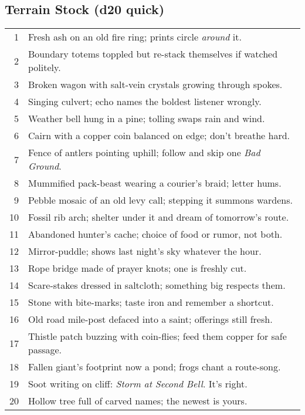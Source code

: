 \subsection*{Terrain Stock (d20 quick)}
\begin{tabular}{r l}
1 & Fresh ash on an old fire ring; prints circle \emph{around} it. \\
2 & Boundary totems toppled but re-stack themselves if watched politely. \\
3 & Broken wagon with salt-vein crystals growing through spokes. \\
4 & Singing culvert; echo names the boldest listener wrongly. \\
5 & Weather bell hung in a pine; tolling swaps rain and wind. \\
6 & Cairn with a copper coin balanced on edge; don’t breathe hard. \\
7 & Fence of antlers pointing uphill; follow and skip one \emph{Bad Ground}. \\
8 & Mummified pack-beast wearing a courier’s braid; letter hums. \\
9 & Pebble mosaic of an old levy call; stepping it summons wardens. \\
10 & Fossil rib arch; shelter under it and dream of tomorrow’s route. \\
11 & Abandoned hunter’s cache; choice of food or rumor, not both. \\
12 & Mirror-puddle; shows last night’s sky whatever the hour. \\
13 & Rope bridge made of prayer knots; one is freshly cut. \\
14 & Scare-stakes dressed in saltcloth; something big respects them. \\
15 & Stone with bite-marks; taste iron and remember a shortcut. \\
16 & Old road mile-post defaced into a saint; offerings still fresh. \\
17 & Thistle patch buzzing with coin-flies; feed them copper for safe passage. \\
18 & Fallen giant’s footprint now a pond; frogs chant a route-song. \\
19 & Soot writing on cliff: \emph{Storm at Second Bell}. It’s right. \\
20 & Hollow tree full of carved names; the newest is yours. \\
\end{tabular}

